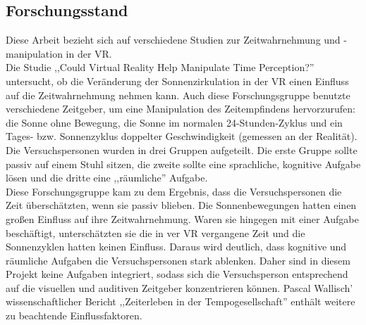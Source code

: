 \documentclass{Paper}
\begin{document}








\subsection{Forschungsstand}
Diese Arbeit bezieht sich auf verschiedene Studien zur Zeitwahrnehmung und -manipulation in der VR. \\
Die Studie ,,Could Virtual Reality Help Manipulate Time Perception?'' untersucht, ob die Veränderung der Sonnenzirkulation in der VR einen Einfluss auf die Zeitwahrnehmung nehmen kann. Auch diese Forschungsgruppe benutzte verschiedene Zeitgeber, um eine Manipulation des Zeitempfindens hervorzurufen: die Sonne ohne Bewegung, die Sonne im normalen 24-Stunden-Zyklus und 
ein Tages- bzw. Sonnenzyklus doppelter Geschwindigkeit (gemessen an der Realität).
 Die Versuchspersonen wurden in drei Gruppen aufgeteilt. Die erste Gruppe sollte passiv auf einem Stuhl sitzen, die zweite sollte eine sprachliche, kognitive Aufgabe lösen und die dritte eine ,,räumliche'' Aufgabe.\\
Diese Forschungsgruppe kam zu dem Ergebnis, dass 
die Versuchspersonen die Zeit überschätzten, wenn sie passiv blieben. Die Sonnenbewegungen hatten einen großen Einfluss auf ihre Zeitwahrnehmung. Waren sie hingegen mit einer Aufgabe beschäftigt, unterschätzten sie die in ver VR vergangene Zeit und die Sonnenzyklen hatten keinen Einfluss. \cite{Device&Systems}
Daraus wird deutlich, dass kognitive und räumliche Aufgaben die Versuchspersonen stark ablenken. Daher sind in diesem Projekt keine Aufgaben integriert, sodass sich die Versuchsperson entsprechend auf die visuellen und auditiven Zeitgeber konzentrieren können.
Pascal Wallisch' wissenschaftlicher Bericht ,,Zeiterleben in der Tempogesellschaft'' enthält weitere zu beachtende Einflussfaktoren.  
\end{document}
